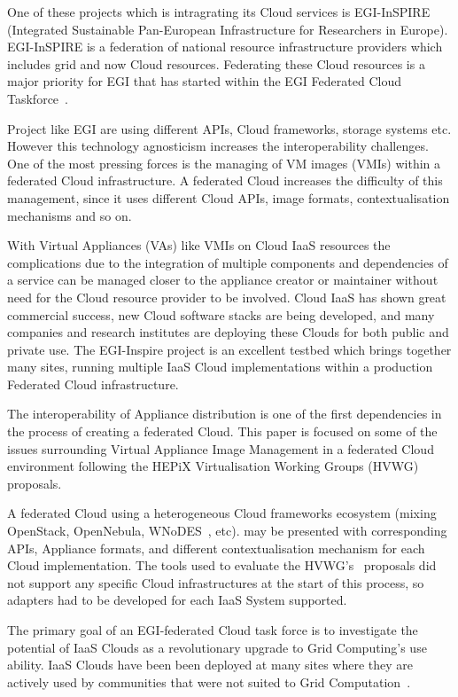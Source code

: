 \documentclass{cai}
\begin{document}
One of these projects which is intragrating its Cloud services is EGI-InSPIRE~\cite{egi} (Integrated Sustainable Pan-European Infrastructure for Researchers in Europe). EGI-InSPIRE is a federation of national resource infrastructure providers which includes grid and now Cloud resources. 
Federating these Cloud resources is a major priority for EGI that has started within the EGI Federated Cloud Taskforce~\cite{fedCloud}.

Project like EGI are using different APIs, Cloud frameworks, storage systems etc. 
However this technology agnosticism increases the interoperability challenges. One of the most pressing forces is the managing of VM images (VMIs) within a federated Cloud infrastructure.
A federated Cloud increases the difficulty of this management, since it uses different Cloud APIs, image formats, contextualisation mechanisms and so on. 

With Virtual Appliances (VAs) like VMIs on Cloud IaaS resources the complications due to the integration of multiple components and dependencies of a service can be managed closer to the appliance creator or maintainer without need for the Cloud resource provider to be involved. 
Cloud IaaS has shown great commercial success, new Cloud software stacks are being developed, and many companies and research institutes are deploying these Clouds for both public and private use. 
The EGI-Inspire project is an excellent testbed which brings together many sites, running multiple IaaS Cloud implementations within a production Federated Cloud infrastructure.

The interoperability of Appliance distribution is one of the first dependencies in the process of creating a federated Cloud. This paper is focused on some of the issues surrounding Virtual Appliance Image Management in a federated Cloud environment following the HEPiX Virtualisation Working Groups (HVWG)~\cite{hepix} proposals.

A federated Cloud using a heterogeneous Cloud frameworks ecosystem (mixing OpenStack, OpenNebula, WNoDES~\cite{wnodes}, etc). may be presented with corresponding APIs, Appliance formats, and different contextualisation mechanism for each Cloud implementation. 
The tools used to evaluate the HVWG's~\cite{hepix} proposals did not support any specific Cloud infrastructures at the start of this process, so adapters had to be developed for each IaaS System supported. 

The primary goal of an EGI-federated Cloud task force is to investigate the potential of IaaS Clouds as a revolutionary upgrade to Grid Computing's use ability. 
IaaS Clouds have been been deployed at many sites where they are actively used by communities that were not suited to Grid Computation~\cite{gridCloud}. 
\end{document}
